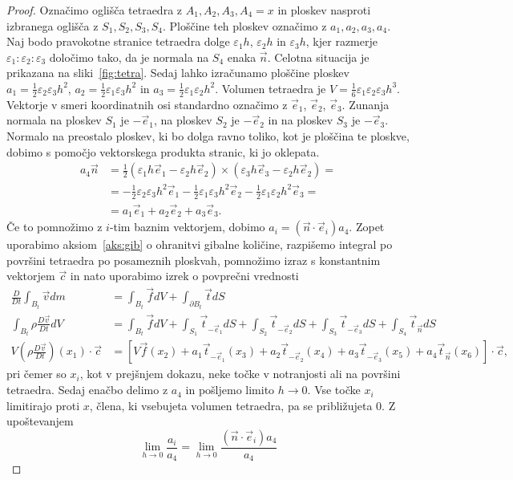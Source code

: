 \documentclass[12pt,a4paper,twoside]{article}
\theoremstyle{definition} %
\theoremstyle{plain} %
\numberwithin{equation}{section}
\newcommand{\eps}{\varepsilon}
\newcommand{\DD}[2]{\ensuremath{\frac{D #1}{D #2}}}
\newcommand{\DDt}[1]{\DD{#1}{t}}
\newcommand{\vv}{\vec{v}}
\newcommand{\vt}{\vec{t}}
\newcommand{\vc}{\vec{c}}
\newcommand{\vn}{\vec{n}}
\newcommand{\vf}{\vec{f}}
\newcommand{\vx}{x}
\newcommand{\ei}{\vec{e}_1}
\newcommand{\ej}{\vec{e}_2}
\newcommand{\ek}{\vec{e}_3}
\begin{document}
\begin{proof}
Označimo oglišča tetraedra z $A_1, A_2, A_3, A_4 = \vx$ in ploskev nasproti izbranega
oglišča z $S_1, S_2, S_3, S_4$. Ploščine teh ploskev označimo z
$a_1, a_2, a_3, a_4$.  Naj bodo pravokotne stranice tetraedra
dolge $\eps_1 h$, $\eps_2 h$ in $\eps_3 h$, kjer razmerje $\eps_1 : \eps_2 : \eps_3$
določimo tako, da je normala na $S_4$ enaka $\vn$.
Celotna situacija je prikazana na sliki~\ref{fig:tetra}.
Sedaj lahko izračunamo ploščine ploskev $a_1 = \frac12 \eps_2\eps_3h^2$,
$a_2 = \frac12 \eps_1\eps_3h^2$ in $a_3 = \frac12 \eps_1\eps_2h^2$.
Volumen tetraedra je $V = \frac16 \eps_1\eps_2\eps_3h^3$.
Vektorje v smeri koordinatnih osi standardno označimo z $\ei$, $\ej$, $\ek$.
Zunanja normala na ploskev $S_1$ je $-\ei$, na ploskev $S_2$ je $-\ej$ in na
ploskev $S_3$ je $-\ek$. Normalo na preostalo ploskev, ki bo dolga ravno toliko,
kot je ploščina te ploskve, dobimo s pomočjo vektorskega produkta
stranic, ki jo oklepata.
\begin{align*}
  a_4\vn &= \frac12 (\eps_1h \ei - \eps_2h \ej) \times (\eps_3h \ek - \eps_2h
  \ej) = \\ &=
  -\frac12 \eps_2\eps_3 h^2\ei
  -\frac12 \eps_1\eps_3 h^2\ej
  -\frac12 \eps_1\eps_2 h^2\ek = \\
  &= a_1 \ei + a_2 \ej + a_3 \ek.
\end{align*}
Če to pomnožimo z $i$-tim baznim vektorjem, dobimo $a_i = (\vn\cdot\vec{e}_i)
a_4$.
Zopet uporabimo aksiom~\ref{aks:gib} o ohranitvi gibalne količine, razpišemo integral po površini
tetraedra po posameznih ploskvah, pomnožimo izraz s konstantnim vektorjem $\vc$ in nato uporabimo
izrek o povprečni vrednosti
\begin{align*}
  \DDt{} \int_{B_t} \vv dm &= \int_{B_t} \vf dV + \int_{\partial {B_t}} \vt dS \\
\int_{B_t} \rho\DDt{\vv} dV &= \int_{B_t} \vf dV +
  \int_{S_1} \vt_{-\ei} dS +
  \int_{S_2} \vt_{-\ej} dS +
  \int_{S_3} \vt_{-\ek} dS +
  \int_{S_4} \vt_{\vn} dS
  \\
  V (\rho\DDt{\vv})(\vx_1)\cdot\vc &= \left[V \vf(\vx_2) +
  a_1 \vt_{-\ei}(\vx_3) + a_2 \vt_{-\ej}(\vx_4) + a_3 \vt_{-\ek}(\vx_5) + a_4
\vt_{\vn}(\vx_6)\right]\cdot \vc,
\end{align*}
pri čemer so $\vx_i$, kot v prejšnjem dokazu, neke točke v notranjosti ali na
površini tetraedra. Sedaj enačbo delimo z $a_4$ in pošljemo limito $h \to 0$.
Vse točke $\vx_i$ limitirajo proti $\vx$, člena, ki vsebujeta volumen tetraedra,
pa se približujeta 0. Z upoštevanjem
\[
  \lim_{h\to0} \frac{a_i}{a_4} = \lim_{h\to0}\frac{(\vn\cdot\vec{e}_i) a_4}{a_4}
\]
\end{proof}
\end{document}
